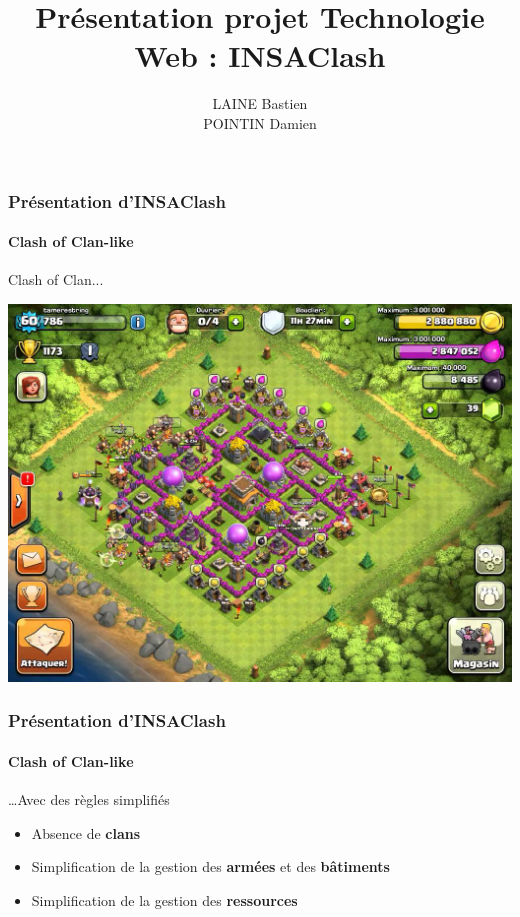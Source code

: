 \documentclass{beamer}
\title{Pr\'esentation projet Technologie Web : INSAClash}
\author{LAINE Bastien \\POINTIN Damien}
\institute{G\'enie Math\'ematique - INSA Rouen}
\begin{document}
    \begin{frame}
    \titlepage
    \end{frame}

    \begin{frame}
        \frametitle{Pr\'esentation d'INSAClash}
        \framesubtitle{Clash of Clan-like}
        Clash of Clan...
        \begin{center}
            \includegraphics[scale=0.2]{images/clashOfClan.jpg}
        \end{center}
    \end{frame}

    \begin{frame}
        \frametitle{Pr\'esentation d'INSAClash}
        \framesubtitle{Clash of Clan-like}
        \ldots Avec des règles simplifi\'es
        \begin{itemize}
            \item Absence de \textbf{clans}
            \item Simplification de la gestion des \textbf{arm\'ees} et des \textbf{bâtiments}
            \item Simplification de la gestion des \textbf{ressources}
        \end{itemize}
    \end{frame}
\end{document}
